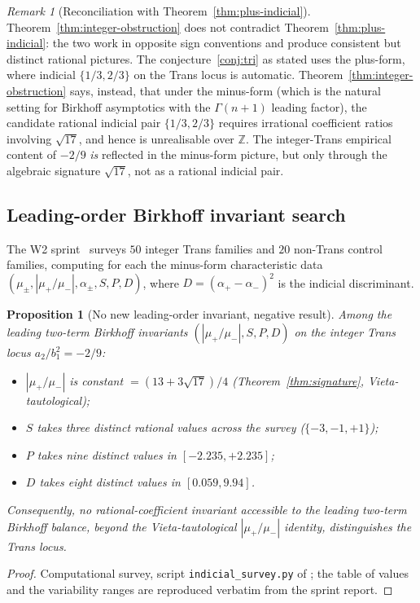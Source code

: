 \documentclass[11pt]{amsart}
\newtheorem{proposition}[theorem]{Proposition}
\theoremstyle{definition}
\theoremstyle{remark}
\newtheorem{remark}[theorem]{Remark}
\newcommand{\Z}{\mathbb{Z}}
\begin{document}
\begin{remark}[Reconciliation with Theorem~\ref{thm:plus-indicial}]
Theorem~\ref{thm:integer-obstruction} does not contradict
Theorem~\ref{thm:plus-indicial}: the two work in opposite sign
conventions and produce consistent but distinct rational pictures.
The conjecture~\ref{conj:tri} as stated uses the plus-form, where
indicial $\{1/3,2/3\}$ on the Trans locus is automatic.
Theorem~\ref{thm:integer-obstruction} says, instead, that under the
minus-form (which is the natural setting for Birkhoff
asymptotics with the $\Gamma(n+1)$ leading factor), the candidate
rational indicial pair $\{1/3,2/3\}$ requires irrational coefficient
ratios involving $\sqrt{17}$, and hence is unrealisable over $\Z$.
The integer-Trans empirical content of $-2/9$ \emph{is} reflected in
the minus-form picture, but only through the algebraic signature
$\sqrt{17}$, not as a rational indicial pair.
\end{remark}

\subsection{Leading-order Birkhoff invariant search}\label{sec:leading}

The W2 sprint~\cite{SprintW2Report} surveys $50$ integer Trans
families and $20$ non-Trans control families, computing for each
the minus-form characteristic data
$(\mu_\pm, |\mu_+/\mu_-|, \alpha_\pm, S, P, D)$, where
$D = (\alpha_+-\alpha_-)^2$ is the indicial discriminant.

\begin{proposition}[No new leading-order invariant, negative result]
\label{prop:leading-invariant}
Among the leading two-term Birkhoff invariants
$(|\mu_+/\mu_-|, S, P, D)$ on the integer Trans locus
$a_2/b_1^2 = -2/9$:
\begin{itemize}[leftmargin=1.4em]
\item $|\mu_+/\mu_-|$ is constant $= (13+3\sqrt{17})/4$
(Theorem~\ref{thm:signature}, Vieta-tautological);
\item $S$ takes three distinct rational values across the survey
($\{-3,-1,+1\}$);
\item $P$ takes nine distinct values in $[-2.235,+2.235]$;
\item $D$ takes eight distinct values in $[0.059,9.94]$.
\end{itemize}
Consequently, no rational-coefficient invariant accessible to the
leading two-term Birkhoff balance, beyond the Vieta-tautological
$|\mu_+/\mu_-|$ identity, distinguishes the Trans locus.
\end{proposition}
\begin{proof}
Computational survey, script \texttt{indicial\_survey.py} of
\cite{SprintW2Report}; the table of values and the variability ranges
are reproduced verbatim from the sprint report.
\end{proof}
\end{document}
